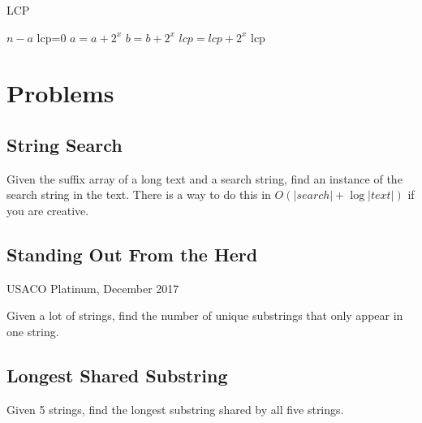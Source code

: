 \documentclass[11pt]{article}
\begin{document}
\begin{algorithm}[H]
\caption{LCP}
\begin{algorithmic}
        \Return $n-a$
    \EndIf
    \State lcp=0
            \State $a = a + 2^x$
            \State $b = b + 2^x$
            \State $lcp = lcp + 2^x$
        \EndIf
    \EndFor
    \Return lcp
\end{algorithmic}
\end{algorithm}

\section{Problems}

\subsection{String Search}

Given the suffix array of a long text and a search string, find an instance of the search string in the text.  There is a way to do this in $O(|search| + \log |text|)$ if you are creative.

\subsection{Standing Out From the Herd}
USACO Platinum, December 2017

Given a lot of strings, find the number of unique substrings that only appear in one string.

\subsection{Longest Shared Substring}

Given 5 strings, find the longest substring shared by all five strings.
\end{document}
